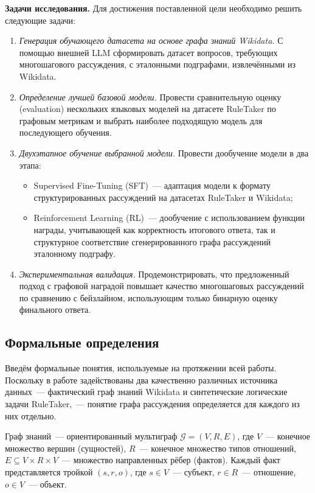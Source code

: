 \textbf{Задачи исследования.}
Для достижения поставленной цели необходимо решить следующие задачи:
\begin{enumerate}
    \setlength{\itemsep}{\smallskipamount}
    \item \textit{Генерация обучающего датасета на основе графа знаний Wikidata.} С помощью внешней LLM сформировать датасет вопросов, требующих многошагового рассуждения, с эталонными подграфами, извлечёнными из Wikidata.
    \item \textit{Определение лучшей базовой модели.} Провести сравнительную оценку (evaluation) нескольких языковых моделей на датасете RuleTaker по графовым метрикам и выбрать наиболее подходящую модель для последующего обучения.
    \item \textit{Двухэтапное обучение выбранной модели.} Провести дообучение модели в два этапа:
    \begin{itemize}
        \item Supervised Fine-Tuning (SFT)~--- адаптация модели к формату структурированных рассуждений на датасетах RuleTaker и Wikidata;
        \item Reinforcement Learning (RL)~--- дообучение с использованием функции награды, учитывающей как корректность итогового ответа, так и структурное соответствие сгенерированного графа рассуждений эталонному подграфу.
    \end{itemize}
    \item \textit{Экспериментальная валидация.} Продемонстрировать, что предложенный подход с графовой наградой повышает качество многошаговых рассуждений по сравнению с бейзлайном, использующим только бинарную оценку финального ответа.
\end{enumerate}

\subsection{Формальные определения}
\label{subsec:formal-definitions}

Введём формальные понятия, используемые на протяжении всей работы. Поскольку в работе задействованы два качественно различных источника данных~--- фактический граф знаний Wikidata и синтетические логические задачи RuleTaker,~--- понятие графа рассуждения определяется для каждого из них отдельно.

\begin{definition}
    \label{def:kg}
    Граф знаний~--- ориентированный мультиграф $\mathcal{G} = (V, R, E)$, где $V$~--- конечное множество вершин (сущностей), $R$~--- конечное множество типов отношений, $E \subseteq V \times R \times V$~--- множество направленных рёбер (фактов). Каждый факт представляется тройкой $(s, r, o)$, где $s \in V$~--- субъект, $r \in R$~--- отношение, $o \in V$~--- объект.
\end{definition}

